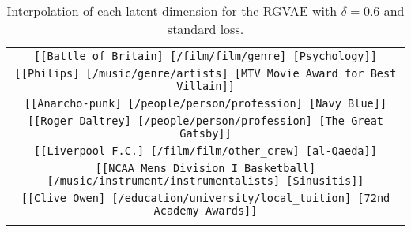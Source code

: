 \begin{longtable}{|c|}
    \texttt{[[Battle of Britain] [/film/film/genre] [Psychology]]}\\
    \texttt{[[Philips] [/music/genre/artists] [MTV Movie Award for Best Villain]]}\\
    \texttt{[[Anarcho-punk] [/people/person/profession] [Navy Blue]]}\\
    \texttt{[[Roger Daltrey] [/people/person/profession] [The Great Gatsby]]}\\
    \texttt{[[Liverpool F.C.] [/film/film/other\_crew] [al-Qaeda]]}\\
    \texttt{[[NCAA Mens Division I Basketball] [/music/instrument/instrumentalists] [Sinusitis]]}\\
    \texttt{[[Clive Owen] [/education/university/local\_tuition] [72nd Academy Awards]]}\\
    \hline
\caption{Interpolation of each latent dimension for the RGVAE with $\delta=0.6$ and standard loss.}
\label{annexA:ipdim95NoPermDelta}
\end{longtable}
